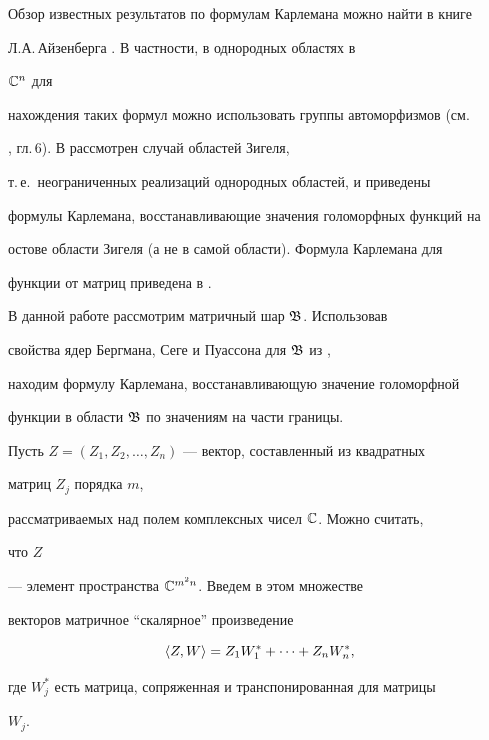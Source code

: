 \label{begin} 


 


Обзор известных результатов по формулам Карлемана можно найти в книге 


Л.А.\,Айзенберга \cite{1}. В частности, в однородных областях в 


$\Bbb C^n$ для 


нахождения таких формул можно использовать группы автоморфизмов (см. 


\cite{1}, гл.\,6). В \cite{2} рассмотрен случай областей Зигеля, 


т.\,е.~неограниченных реализаций однородных областей, и приведены 


формулы Карлемана, восстанавливающие значения голоморфных функций на 


остове области Зигеля (а не в самой области). Формула Карлемана для 


функции от матриц приведена в \cite{3}. 


 


В данной работе рассмотрим матричный шар $\frak B$. Использовав 


свойства ядер Бергмана, Сеге и Пуассона для $\frak B$ из \cite{4}, 


находим формулу Карлемана, восстанавливающую значение голоморфной 


функции в области $\frak B$ по значениям на части границы. 


 


Пусть $Z=(Z_1,Z_2,\dotsc,Z_n)$ --- вектор, составленный из квадратных 


матриц $Z_j$ порядка $m$, 


рассматриваемых над полем комплексных чисел $\Bbb C$. Можно считать, 


что $Z$ 


--- элемент пространства $\Bbb C^{m^2n}$. Введем в этом множестве 


векторов матричное ``скалярное'' произведение 


$$ 


\la Z,W\ra=Z_1W^*_1+\dotsb+Z_n W^*_n, 


$$ 


где $W^*_j$ есть матрица, сопряженная и транспонированная для матрицы 


$W_j$. 


 


